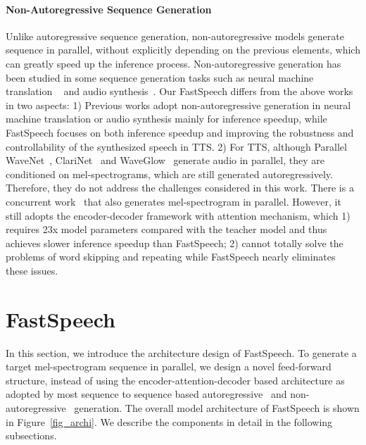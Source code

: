 \documentclass{article}
\begin{document}
\paragraph{Non-Autoregressive Sequence Generation} \label{non-ars2s}

Unlike autoregressive sequence generation, non-autoregressive models generate sequence in parallel, without explicitly depending on the previous elements, which can greatly speed up the inference process. Non-autoregressive generation has been studied in some sequence generation tasks such as neural machine translation ~\citep{gu2017non, guo2019aaai, wang2019non} and audio synthesis~\citep{oord2017parallel,ping2018clarinet, prenger2019waveglow}. Our FastSpeech differs from the above works in two aspects: 1) Previous works adopt non-autoregressive generation in neural machine translation or audio synthesis mainly for inference speedup, while FastSpeech focuses on both inference speedup and improving the robustness and controllability of the synthesized speech in TTS. 2) For TTS, although Parallel WaveNet~\citep{oord2017parallel}, ClariNet~\citep{ping2018clarinet} and WaveGlow~\citep{prenger2019waveglow} generate audio in parallel, they are conditioned on mel-spectrograms, which are still generated autoregressively. Therefore, they do not address the challenges considered in this work. There is a concurrent work~\citep{peng2019parallel} that also generates mel-spectrogram in parallel. However, it still adopts the encoder-decoder framework with attention mechanism, which 1) requires 23x model parameters compared with the teacher model and thus achieves slower inference speedup than FastSpeech; 2) cannot totally solve the problems of word skipping and repeating while FastSpeech nearly eliminates these issues.       

\section{FastSpeech}
In this section, we introduce the architecture design of FastSpeech. To generate a target mel-spectrogram sequence in parallel, we design a novel feed-forward structure, instead of using the encoder-attention-decoder based architecture as adopted by most sequence to sequence based autoregressive~\citep{vaswani2017attention,shen2018natural,li2018close} and non-autoregressive~\citep{gu2017non, guo2019aaai, wang2019non} generation. The overall model architecture of FastSpeech is shown in Figure~\ref{fig_archi}. We describe the components in detail in the following subsections.
\end{document}
